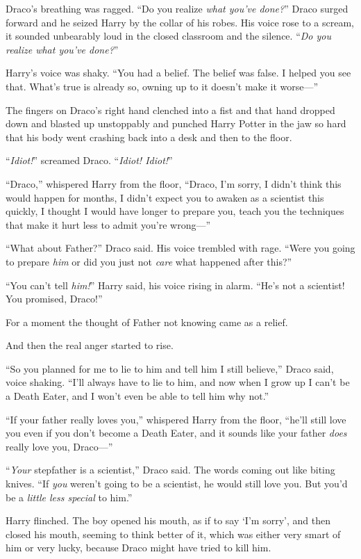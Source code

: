 Draco’s breathing was ragged. “Do you realize \emph{what you’ve done?}” Draco
surged forward and he seized Harry by the collar of his robes. His voice rose
to a scream, it sounded unbearably loud in the closed classroom and the
silence. “\emph{Do you realize what you’ve done?}”

Harry’s voice was shaky. “You had a belief. The belief was false. I helped you
see that. What’s true is already so, owning up to it doesn’t make it worse—”

The fingers on Draco’s right hand clenched into a fist and that hand dropped
down and blasted up unstoppably and punched Harry Potter in the jaw so hard
that his body went crashing back into a desk and then to the floor.

“\emph{Idiot!}” screamed Draco. “\emph{Idiot! Idiot!}”

“Draco,” whispered Harry from the floor, “Draco, I’m sorry, I didn’t think this
would happen for months, I didn’t expect you to awaken as a scientist this
quickly, I thought I would have longer to prepare you, teach you the techniques
that make it hurt less to admit you’re wrong—”

“What about Father?” Draco said. His voice trembled with rage. “Were you going
to prepare \emph{him} or did you just not \emph{care} what happened after this?”

“You can’t tell \emph{him!}” Harry said, his voice rising in alarm. “He’s not a
scientist! You promised, Draco!”

For a moment the thought of Father not knowing came as a relief.

And then the real anger started to rise.

“So you planned for me to lie to him and tell him I still believe,” Draco said,
voice shaking. “I’ll always have to lie to him, and now when I grow up I can’t
be a Death Eater, and I won’t even be able to tell him why not.”

“If your father really loves you,” whispered Harry from the floor, “he’ll still
love you even if you don’t become a Death Eater, and it sounds like your father
\emph{does} really love you, Draco—”

“\emph{Your} stepfather is a scientist,” Draco said. The words coming out like
biting knives. “If \emph{you} weren’t going to be a scientist, he would still
love you. But you’d be a \emph{little less special} to him.”

Harry flinched. The boy opened his mouth, as if to say ‘I’m sorry’, and then
closed his mouth, seeming to think better of it, which was either very smart of
him or very lucky, because Draco might have tried to kill him.

